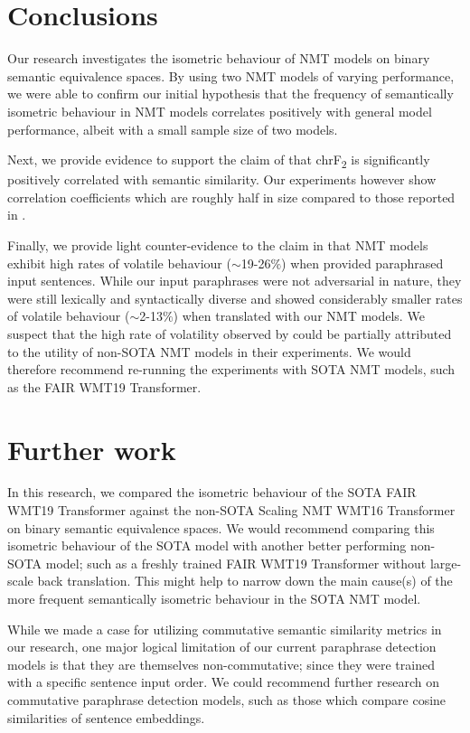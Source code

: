 \documentclass[11pt,a4paper]{article}
\begin{document}
\section{Conclusions}

Our research investigates the isometric behaviour of NMT models on binary semantic equivalence spaces. By using two NMT models of varying performance, we were able to confirm our initial hypothesis that the frequency of semantically isometric behaviour in NMT models correlates positively with general model performance, albeit with a small sample size of two models. 

Next, we provide evidence to support the claim of \citet{michel2019evaluation} that chrF\textsubscript{2} is significantly positively correlated with semantic similarity. Our experiments however show correlation coefficients which are roughly half in size compared to those reported in \citet{michel2019evaluation}.

Finally, we provide light counter-evidence to the claim in \citet{fadaee2020unreasonable} that NMT models exhibit high rates of volatile behaviour ($\sim$19-26$\%$) when provided paraphrased input sentences. While our input paraphrases were not adversarial in nature, they were still lexically and syntactically diverse and showed considerably smaller rates of volatile behaviour ($\sim$2-13$\%$) when translated with our NMT models. We suspect that the high rate of volatility observed by \citet{fadaee2020unreasonable} could be partially attributed to the utility of non-SOTA NMT models in their experiments. We would therefore recommend re-running the experiments with SOTA NMT models, such as the FAIR WMT19 Transformer. 

\section{Further work}

In this research, we compared the isometric behaviour of the SOTA FAIR WMT19 Transformer against the non-SOTA Scaling NMT WMT16 Transformer on binary semantic equivalence spaces. We would recommend comparing this isometric behaviour of the SOTA model with another better performing non-SOTA model; such as a freshly trained FAIR WMT19 Transformer without large-scale back translation. This might help to narrow down the main cause(s) of the more frequent semantically isometric behaviour in the SOTA NMT model.

While we made a case for utilizing commutative semantic similarity metrics in our research, one major logical limitation of our current paraphrase detection models is that they are themselves non-commutative; since they were trained with a specific sentence input order. We could recommend further research on commutative paraphrase detection models, such as those which compare cosine similarities of sentence embeddings.
\end{document}
